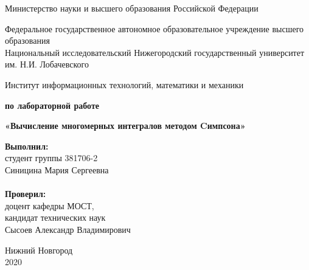 \documentclass{report}
\begin{document}
\begin{titlepage}

\begin{center}
Министерство науки и высшего образования Российской Федерации
\end{center}

\begin{center}
Федеральное государственное автономное образовательное учреждение высшего образования \\
Национальный исследовательский Нижегородский государственный университет им. Н.И. Лобачевского
\end{center}

\begin{center}
Институт информационных технологий, математики и механики
\end{center}

\vspace{4em}

\begin{center}
\textbf{ по лабораторной работе} \\
\end{center}
\begin{center}
\textbf{\Large«Вычисление многомерных интегралов методом Cимпсона»} \\
\end{center}

\vspace{5em}

\newbox{\lbox}
\newlength{\maxl}
\setlength{\maxl}{\wd\lbox}
\hfill\parbox{7,5cm}{
\hspace*{5cm}\hspace*{-5cm}\textbf{Выполнил:} \\ студент группы 381706-2 \\ Синицина Мария Сергеевна\\
\\
\hspace*{5cm}\hspace*{-5cm}\textbf{Проверил:}\\ доцент кафедры МОСТ, \\ кандидат технических наук \\ Сысоев Александр Владимирович
}

\vspace{\fill}

\begin{center} Нижний Новгород \\ 2020 \end{center}

\end{titlepage}
\end{document}
